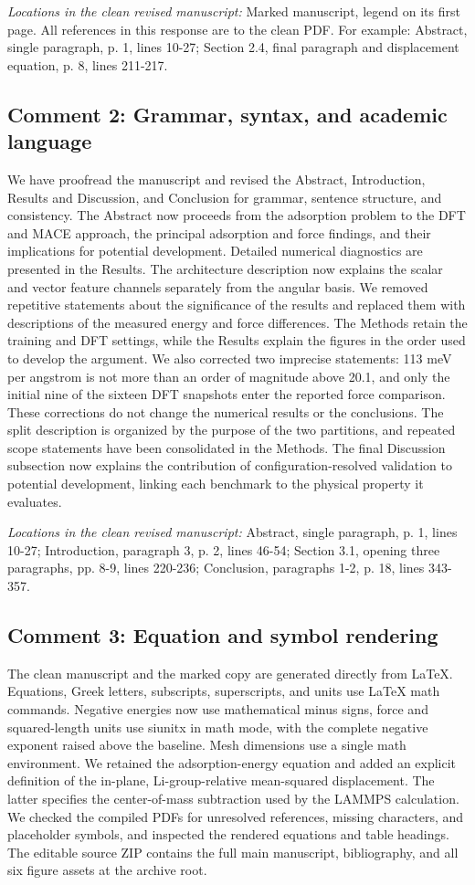 \documentclass[11pt]{article}
\begin{document}
\textit{Locations in the clean revised manuscript:} Marked manuscript, legend on its first page. All references in this response are to the clean PDF. For example: Abstract, single paragraph, p. 1, lines 10-27; Section 2.4, final paragraph and displacement equation, p. 8, lines 211-217.
\subsection*{Comment 2: Grammar, syntax, and academic language}
We have proofread the manuscript and revised the Abstract, Introduction, Results and Discussion, and Conclusion for grammar, sentence structure, and consistency. The Abstract now proceeds from the adsorption problem to the DFT and MACE approach, the principal adsorption and force findings, and their implications for potential development. Detailed numerical diagnostics are presented in the Results. The architecture description now explains the scalar and vector feature channels separately from the angular basis. We removed repetitive statements about the significance of the results and replaced them with descriptions of the measured energy and force differences. The Methods retain the training and DFT settings, while the Results explain the figures in the order used to develop the argument. We also corrected two imprecise statements: 113 meV per angstrom is not more than an order of magnitude above 20.1, and only the initial nine of the sixteen DFT snapshots enter the reported force comparison. These corrections do not change the numerical results or the conclusions. The split description is organized by the purpose of the two partitions, and repeated scope statements have been consolidated in the Methods. The final Discussion subsection now explains the contribution of configuration-resolved validation to potential development, linking each benchmark to the physical property it evaluates.

\textit{Locations in the clean revised manuscript:} Abstract, single paragraph, p. 1, lines 10-27; Introduction, paragraph 3, p. 2, lines 46-54; Section 3.1, opening three paragraphs, pp. 8-9, lines 220-236; Conclusion, paragraphs 1-2, p. 18, lines 343-357.
\subsection*{Comment 3: Equation and symbol rendering}
The clean manuscript and the marked copy are generated directly from LaTeX. Equations, Greek letters, subscripts, superscripts, and units use LaTeX math commands. Negative energies now use mathematical minus signs, force and squared-length units use siunitx in math mode, with the complete negative exponent raised above the baseline. Mesh dimensions use a single math environment. We retained the adsorption-energy equation and added an explicit definition of the in-plane, Li-group-relative mean-squared displacement. The latter specifies the center-of-mass subtraction used by the LAMMPS calculation. We checked the compiled PDFs for unresolved references, missing characters, and placeholder symbols, and inspected the rendered equations and table headings. The editable source ZIP contains the full main manuscript, bibliography, and all six figure assets at the archive root.
\end{document}
